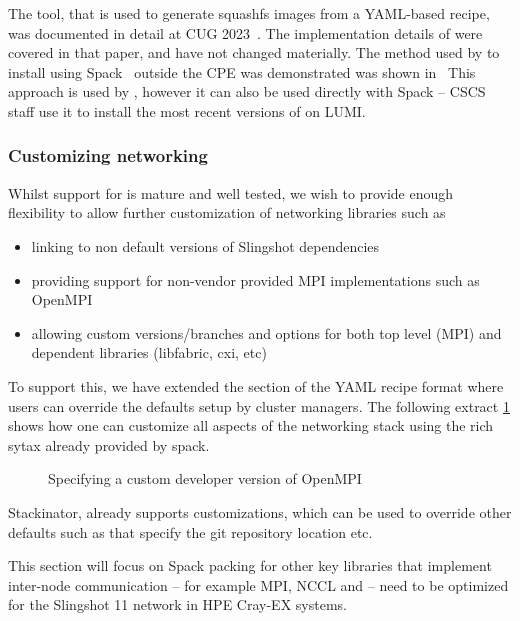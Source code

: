 The  \stackinator tool, that is used to generate squashfs images from a YAML-based recipe, was documented in detail at CUG 2023~\cite{uenv2023}.
The implementation details of \stackinator were covered in that paper, and have not changed materially.
The method used by \stackinator to install \craympich using Spack~\cite{gamblin:sc15} outside the CPE was demonstrated was shown in~\cite{uenv2023}
This approach is used by \stackinator, however it can also be used directly with Spack -- CSCS staff use it to install the most recent versions of \craympich on LUMI.

\subsubsection{Customizing networking}
\label{sec:networking}
Whilst support for \craympich is mature and well tested, we wish to provide enough flexibility to allow further customization of networking libraries such as
\begin{itemize}
    \item linking \craympich to non default versions of Slingshot dependencies
    \item providing support for non-vendor provided MPI implementations such as OpenMPI
    \item allowing custom versions/branches and options for both top level (MPI) and dependent libraries (libfabric, cxi, etc)
\end{itemize}
To support this, we have extended the  section of the \stackinator YAML recipe format where users can override the defaults setup by cluster managers. The following extract \ref{fig:openmpi-config} shows how one can customize all aspects of the networking stack using the rich sytax already provided by spack.
\begin{figure}[htp!]
    
    \caption{Specifying a custom developer version of OpenMPI}
    \label{fig:openmpi-config}
\end{figure}
Stackinator, already supports  customizations, which can be used to override other defaults such as  that specify the git repository location etc.


This section will focus on Spack packing for other key libraries that implement inter-node communication -- for example MPI, NCCL and \nvshmem -- need to be optimized for the Slingshot 11 network in HPE Cray-EX systems.

